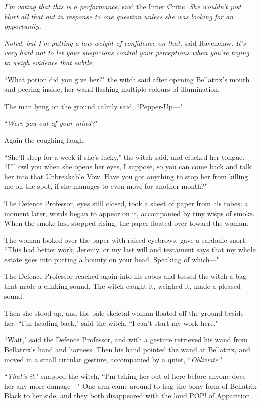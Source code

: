 \emph{I'm voting that this is a performance,} said the Inner Critic. \emph{She wouldn't just blurt all that out in response to one question unless she was looking for an opportunity.}

\emph{Noted, but I'm putting a low weight of confidence on that,} said Ravenclaw. \emph{It's very hard not to let your suspicions control your perceptions when you're trying to weigh evidence that subtle.}

``What potion did you give her?" the witch said after opening Bellatrix's mouth and peering inside, her wand flashing multiple colours of illumination.

The man lying on the ground calmly said, ``Pepper-Up—"

``\emph{Were you out of your mind?}"

Again the coughing laugh.

``She'll sleep for a week if she's lucky," the witch said, and clucked her tongue. ``I'll owl you when she opens her eyes, I suppose, so you can come back and talk her into that Unbreakable Vow. Have you got anything to stop her from killing me on the spot, if she manages to even move for another month?"

The Defence Professor, eyes still closed, took a sheet of paper from his robes; a moment later, words began to appear on it, accompanied by tiny wisps of smoke. When the smoke had stopped rising, the paper floated over toward the woman.

The woman looked over the paper with raised eyebrows, gave a sardonic snort. ``This had better work, Jeremy, or my last will and testament says that my whole estate goes into putting a bounty on your head. Speaking of which—"

The Defence Professor reached again into his robes and tossed the witch a bag that made a clinking sound. The witch caught it, weighed it, made a pleased sound.

Then she stood up, and the pale skeletal woman floated off the ground beside her. ``I'm heading back," said the witch. ``I can't start my work here."

``Wait," said the Defence Professor, and with a gesture retrieved his wand from Bellatrix's hand and harness. Then his hand pointed the wand at Bellatrix, and moved in a small circular gesture, accompanied by a quiet, ``\emph{Obliviate}."

``\emph{That's it}," snapped the witch, ``I'm taking her out of here before anyone does her any more damage—" One arm came around to hug the bony form of Bellatrix Black to her side, and they both disappeared with the loud POP! of Apparition.


